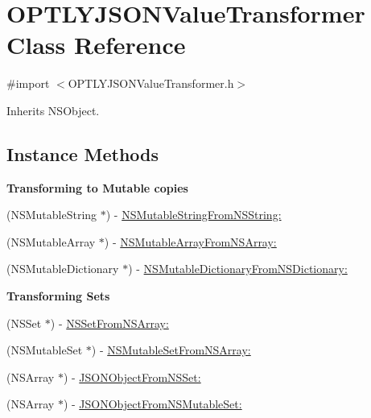 \hypertarget{interface_o_p_t_l_y_j_s_o_n_value_transformer}{}\section{O\+P\+T\+L\+Y\+J\+S\+O\+N\+Value\+Transformer Class Reference}
\label{interface_o_p_t_l_y_j_s_o_n_value_transformer}


{\ttfamily \#import $<$O\+P\+T\+L\+Y\+J\+S\+O\+N\+Value\+Transformer.\+h$>$}



Inherits N\+S\+Object.

\subsection*{Instance Methods}
\begin{Indent}\textbf{ Transforming to Mutable copies}\par
\begin{DoxyCompactItemize}
\item 
(N\+S\+Mutable\+String $\ast$) -\/ \mbox{\hyperlink{interface_o_p_t_l_y_j_s_o_n_value_transformer_a43418fb2a9817c762bbcd026b9b1163c}{N\+S\+Mutable\+String\+From\+N\+S\+String\+:}}
\item 
(N\+S\+Mutable\+Array $\ast$) -\/ \mbox{\hyperlink{interface_o_p_t_l_y_j_s_o_n_value_transformer_afb4db61bf86ffd4ab520bb9454ebdcc9}{N\+S\+Mutable\+Array\+From\+N\+S\+Array\+:}}
\item 
(N\+S\+Mutable\+Dictionary $\ast$) -\/ \mbox{\hyperlink{interface_o_p_t_l_y_j_s_o_n_value_transformer_a18dddf642783cee07d55379c9b37eaf4}{N\+S\+Mutable\+Dictionary\+From\+N\+S\+Dictionary\+:}}
\end{DoxyCompactItemize}
\end{Indent}
\begin{Indent}\textbf{ Transforming Sets}\par
\begin{DoxyCompactItemize}
\item 
(N\+S\+Set $\ast$) -\/ \mbox{\hyperlink{interface_o_p_t_l_y_j_s_o_n_value_transformer_ac2e99a0aa46534302bafca4746b18d55}{N\+S\+Set\+From\+N\+S\+Array\+:}}
\item 
(N\+S\+Mutable\+Set $\ast$) -\/ \mbox{\hyperlink{interface_o_p_t_l_y_j_s_o_n_value_transformer_a56e0e127329b6312a5e6b0fc7da5f921}{N\+S\+Mutable\+Set\+From\+N\+S\+Array\+:}}
\item 
(N\+S\+Array $\ast$) -\/ \mbox{\hyperlink{interface_o_p_t_l_y_j_s_o_n_value_transformer_a208a82b73cfad7fe9f975dc0ddedcd4b}{J\+S\+O\+N\+Object\+From\+N\+S\+Set\+:}}
\item 
(N\+S\+Array $\ast$) -\/ \mbox{\hyperlink{interface_o_p_t_l_y_j_s_o_n_value_transformer_abcc27ccc01a91eb265ded723b9e240a2}{J\+S\+O\+N\+Object\+From\+N\+S\+Mutable\+Set\+:}}
\end{DoxyCompactItemize}
\end{Indent}
